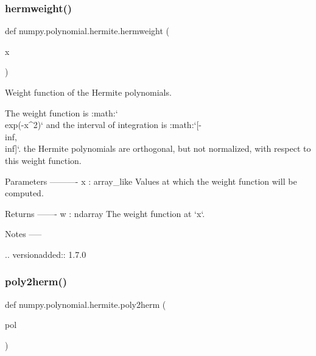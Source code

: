 \subsubsection{\texorpdfstring{hermweight()}{hermweight()}}
{\footnotesize\ttfamily def numpy.\+polynomial.\+hermite.\+hermweight (\begin{DoxyParamCaption}\item[{}]{x }\end{DoxyParamCaption})}

\begin{DoxyVerb}Weight function of the Hermite polynomials.

The weight function is :math:`\\exp(-x^2)` and the interval of
integration is :math:`[-\\inf, \\inf]`. the Hermite polynomials are
orthogonal, but not normalized, with respect to this weight function.

Parameters
----------
x : array_like
   Values at which the weight function will be computed.

Returns
-------
w : ndarray
   The weight function at `x`.

Notes
-----

.. versionadded:: 1.7.0\end{DoxyVerb}
 \mbox{\label{namespacenumpy_1_1polynomial_1_1hermite_ab778d0c46658fca79de8c9ae4ddcc283}} 
\subsubsection{\texorpdfstring{poly2herm()}{poly2herm()}}
{\footnotesize\ttfamily def numpy.\+polynomial.\+hermite.\+poly2herm (\begin{DoxyParamCaption}\item[{}]{pol }\end{DoxyParamCaption})}

